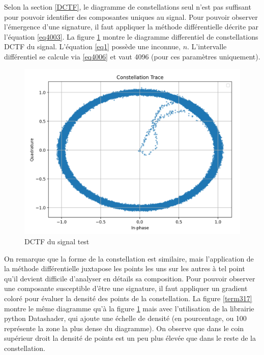 \vspace{0.1cm}

Selon la section \ref{DCTF}, le diagramme de constellations seul n'est pas suffisant pour pouvoir identifier des composantes uniques au signal. Pour pouvoir observer l'émergence d'une signature, il faut appliquer la méthode différentielle décrite par l'équation \ref{eq4003}. La figure \ref{term316} montre le diagramme differentiel de constellations \ac{DCTF} du signal. L'équation \ref{eq1} possède une inconnue, $n$. L'intervalle différentiel se calcule via \ref{eq4006} et vaut 4096 (pour ces paramètres uniquement).


\newpage

\begin{figure}[h]
\centering

\includegraphics[scale=0.25]{images/dctf3.png}
\caption{DCTF du signal test}\label{term316}
\end{figure}

On remarque que la forme de la constellation est similaire, mais l'application de la méthode différentielle juxtapose les points les uns sur les autres à tel point qu'il devient difficile d'analyser en détails sa composition. Pour pouvoir observer une composante susceptible d'être une signature, il faut appliquer un gradient coloré pour évaluer la densité des points de la constellation. La figure \ref{term317} montre le même diagramme qu'à la figure \ref{term316} mais avec l'utilisation de la librairie python Datashader, qui ajoute une échelle de densité (en pourcentage, ou 100 représente la zone la plus dense du diagramme). On observe que dans le coin supérieur droit la densité de points est un peu plus élevée que dans le reste de la constellation.

